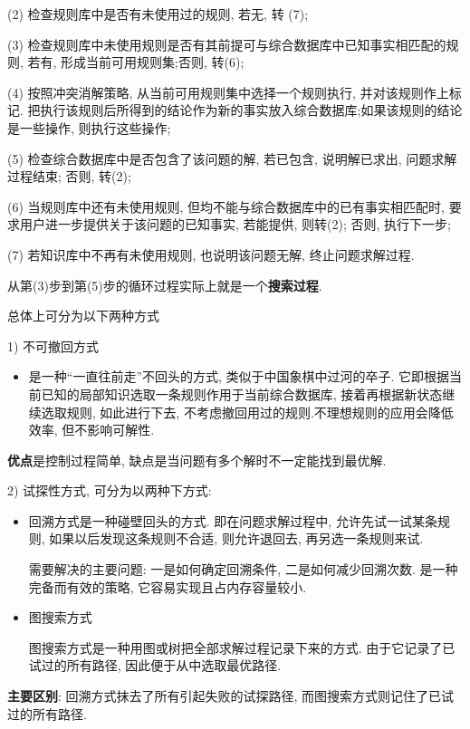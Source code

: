 (2) 检查规则库中是否有未使用过的规则, 若无, 转 (7);

(3) 检查规则库中未使用规则是否有其前提可与综合数据库中已知事实相匹配的规则, 若有, 形成当前可用规则集;否则, 转(6);

(4) 按照冲突消解策略, 从当前可用规则集中选择一个规则执行, 并对该规则作上标记. 把执行该规则后所得到的结论作为新的事实放入综合数据库;如果该规则的结论是一些操作, 则执行这些操作;

(5) 检查综合数据库中是否包含了该问题的解, 若已包含, 说明解已求出, 问题求解过程结束; 否则, 转(2);

(6) 当规则库中还有未使用规则, 但均不能与综合数据库中的已有事实相匹配时, 要求用户进一步提供关于该问题的已知事实, 若能提供, 则转(2); 否则, 执行下一步;

(7) 若知识库中不再有未使用规则, 也说明该问题无解, 终止问题求解过程.
\begin{remark}
  从第(3)步到第(5)步的循环过程实际上就是一个\textbf{搜索过程}.
\end{remark}

总体上可分为以下两种方式

1) 不可撤回方式

\begin{itemize}
    \item 是一种“一直往前走”不回头的方式, 类似于中国象棋中过河的卒子.
    它即根据当前已知的局部知识选取一条规则作用于当前综合数据库, 接着再根据新状态继续选取规则, 如此进行下去, 不考虑撤回用过的规则.不理想规则的应用会降低效率, 但不影响可解性.
\end{itemize}

\textbf{优点}是控制过程简单, 缺点是当问题有多个解时不一定能找到最优解.

2) 试探性方式, 可分为以两种下方式:
\begin{itemize}
    \item 回溯方式是一种碰壁回头的方式. 即在问题求解过程中, 允许先试一试某条规则, 如果以后发现这条规则不合适, 则允许退回去, 再另选一条规则来试.

          需要解决的主要问题: 一是如何确定回溯条件, 二是如何减少回溯次数. 是一种完备而有效的策略, 它容易实现且占内存容量较小.

    \item 图搜索方式

         图搜索方式是一种用图或树把全部求解过程记录下来的方式. 由于它记录了已试过的所有路径, 因此便于从中选取最优路径.
\end{itemize}
\begin{remark}
\textbf{主要区别}: 回溯方式抹去了所有引起失败的试探路径, 而图搜索方式则记住了已试过的所有路径.
\end{remark}
